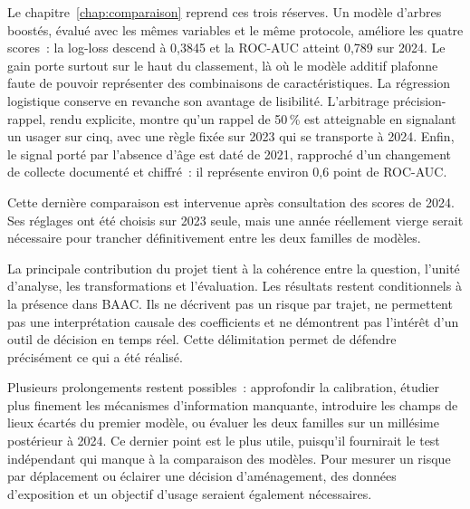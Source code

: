 Le chapitre~\ref{chap:comparaison} reprend ces trois réserves. Un modèle d'arbres
boostés, évalué avec les mêmes variables et le même protocole, améliore les quatre
scores~: la log-loss descend à 0,3845 et la ROC-AUC atteint 0,789 sur 2024. Le gain
porte surtout sur le haut du classement, là où le modèle additif plafonne faute de
pouvoir représenter des combinaisons de caractéristiques. La régression logistique
conserve en revanche son avantage de lisibilité. L'arbitrage précision-rappel, rendu
explicite, montre qu'un rappel de 50\,\% est atteignable en signalant un usager sur
cinq, avec une règle fixée sur 2023 qui se transporte à 2024. Enfin, le signal porté
par l'absence d'âge est daté de 2021, rapproché d'un changement de collecte documenté
et chiffré~: il représente environ 0,6 point de ROC-AUC.

Cette dernière comparaison est intervenue après consultation des scores de 2024.
Ses réglages ont été choisis sur 2023 seule, mais une année réellement vierge serait
nécessaire pour trancher définitivement entre les deux familles de modèles.

La principale contribution du projet tient à la cohérence entre la question,
l'unité d'analyse, les transformations et l'évaluation. Les résultats restent
conditionnels à la présence dans BAAC. Ils ne décrivent pas un risque par trajet,
ne permettent pas une interprétation causale des coefficients et ne démontrent
pas l'intérêt d'un outil de décision en temps réel. Cette délimitation permet
de défendre précisément ce qui a été réalisé.

Plusieurs prolongements restent possibles~: approfondir la calibration, étudier plus
finement les mécanismes d'information manquante, introduire les champs de lieux écartés
du premier modèle, ou évaluer les deux familles sur un millésime postérieur à 2024.
Ce dernier point est le plus utile, puisqu'il fournirait le test indépendant qui manque
à la comparaison des modèles. Pour mesurer un risque par déplacement ou éclairer une
décision d'aménagement, des données d'exposition et un objectif d'usage seraient
également nécessaires.

